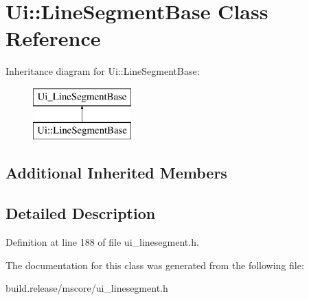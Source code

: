 \hypertarget{class_ui_1_1_line_segment_base}{}\section{Ui\+:\+:Line\+Segment\+Base Class Reference}
\label{class_ui_1_1_line_segment_base}
Inheritance diagram for Ui\+:\+:Line\+Segment\+Base\+:\begin{figure}[H]
\begin{center}
\leavevmode
\includegraphics[height=2.000000cm]{class_ui_1_1_line_segment_base}
\end{center}
\end{figure}
\subsection*{Additional Inherited Members}


\subsection{Detailed Description}


Definition at line 188 of file ui\+\_\+linesegment.\+h.



The documentation for this class was generated from the following file\+:\begin{DoxyCompactItemize}
\item 
build.\+release/mscore/ui\+\_\+linesegment.\+h\end{DoxyCompactItemize}

